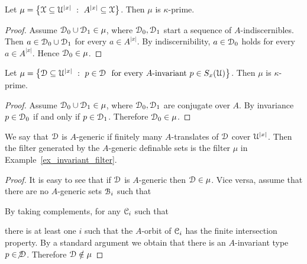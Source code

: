 \documentclass{amsproc}
\begin{document}
\begin{example}\label{ex_mu_fin_sat}
  Let $\mu=\big\{\EuScript X\subseteq\EuScript U^{|x|}\ :\ A^{|x|}\subseteq\EuScript X\big\}$.
  Then $\mu$ is $\kappa$-prime.
\end{example}

\begin{proof} 
  Assume $\EuScript D_0\cup\EuScript D_1\in\mu$, where $\EuScript D_0,\EuScript D_1$ start a sequence of $A$-indiscernibles.
  Then $a\in\EuScript D_0\cup\EuScript D_1$ for every $a\in A^{|x|}$.
  By indiscernibility, $a\in\EuScript D_0$ holds for every $a\in A^{|x|}$.
  Hence $\EuScript D_0\in\mu$.
\end{proof}


\begin{example}\label{ex_invariant_filter}
  Let $\mu=\big\{\EuScript D\subseteq\EuScript U^{|x|}\ :\ p\in\EuScript D\ {\rm\ for\ every\ } A\textrm{-invariant}\ p\in S_x(\EuScript U) \big\}$.
  Then $\mu$ is $\kappa$-prime.
\end{example}

\begin{proof}
  Assume $\EuScript D_0\cup\EuScript D_1\in\mu$, where $\EuScript D_0,\EuScript D_1$ are conjugate over $A$.
  By invariance $p\in\EuScript D_0$ if and only if $p\in\EuScript D_1$. Therefore $\EuScript D_0\in\mu$.
\end{proof}

\begin{example}
  We say that $\EuScript D$ is $A$-generic if finitely many $A$-translates of $\EuScript D$ cover $\EuScript U^{|x|}$.
  Then the filter generated by the $A$-generic definable sets is the filter $\mu$ in Example~\ref{ex_invariant_filter}.
\end{example}
  
\begin{proof}
  It is easy to see that if $\EuScript D$ is $A$-generic then $\EuScript D\in\mu$.
  Vice versa, assume that there are no $A$-generic sets  $\EuScript B_i$ such that 


  By taking complements, for any $\EuScript C_i$ such that 
  

  there is at least one $i$ such that the $A$-orbit of $\EuScript C_i$ has the finite intersection property.
  By a standard argument we obtain that there is an $A$-invariant type $p\in\not\EuScript D$.
  Therefore $\EuScript D\notin\mu$
\end{proof}
\end{document}
